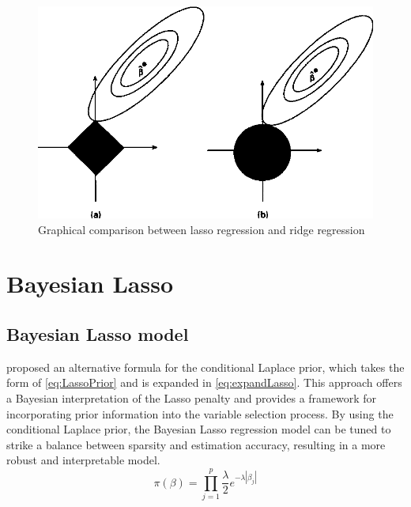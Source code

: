 \begin{figure}
	\includegraphics[width=\linewidth]{lassodemo}
	\caption{Graphical comparison between lasso regression and ridge regression}
	\label{fig:lassodemo}
\end{figure}

\section{Bayesian Lasso}
\subsection{Bayesian Lasso model}
\cite{park_casella_2008} proposed an alternative formula for the conditional Laplace prior, which takes the form of \autoref{eq:LassoPrior} and is expanded in \autoref{eq:expandLasso}. This approach offers a Bayesian interpretation of the Lasso penalty and provides a framework for incorporating prior information into the variable selection process. By using the conditional Laplace prior, the Bayesian Lasso regression model can be tuned to strike a balance between sparsity and estimation accuracy, resulting in a more robust and interpretable model.
\begin{equation}
	\label{eq:expandLasso}
	\pi(\beta) = \prod_{j=1}^p \frac{\lambda}{2} e^{-\lambda|\beta_j|}
\end{equation}

